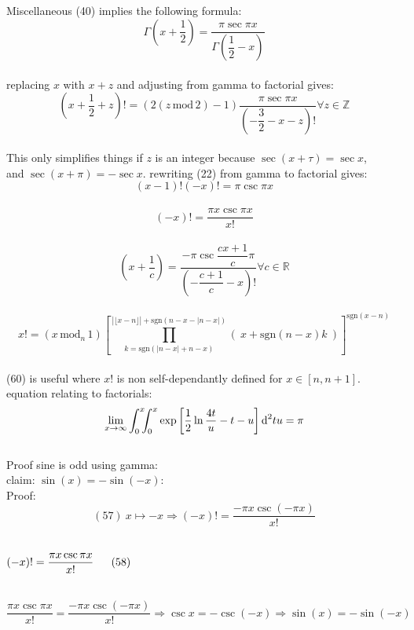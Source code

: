\documentclass[12pt]{article}
\begin{document}
\pagebreak\begin{section}{Miscellaneous}
	(40) implies the following formula:
	\begin{equation}
		\Gamma\left(x+\dfrac12\right)=\dfrac{\pi\sec\pi x}{\Gamma\left(\dfrac12-x\right)}
	\end{equation}\\
	replacing $x$ with $x+z$ and adjusting from gamma to factorial gives:\\
	\begin{equation}
		\left(x+\frac12+z\right)!=\left(2\left(z\,\text{mod}\,2\right)-1\right)\dfrac{\pi\sec\pi x}{\left(-\dfrac32-x-z\right)!}\forall z\in\mathbb Z
	\end{equation}\\
	This only simplifies things if $z$ is an integer because $\sec(x+\tau)=\sec x$,\\
	and $\sec(x+\pi)=-\sec x$. rewriting (22) from gamma to factorial gives:
	\begin{equation}
		(x-1)!(-x)!=\pi\csc\pi x
	\end{equation}\\
	\begin{equation}
		(-x)!=\dfrac{\pi x\csc\pi x}{x!}
	\end{equation}\\
	\begin{equation}
		\left(x+\dfrac1c\right)=\dfrac{-\pi\csc\dfrac{cx+1}c\pi}{\left(-\dfrac{c+1}c-x\right)!}\forall c\in\mathbb R
	\end{equation}\\
	\begin{equation}
		x!=(x\,\text{mod}_n\,1)\left[\prod_{k=\text{sgn}(|n-x|+n-x)}^{|\lfloor x-n\rfloor|+\text{sgn}(n-x-|n-x|)}\left(~x+\text{sgn}(n-x)k~\right)\right]^{\text{sgn}(x-n)}
	\end{equation}\\
	(60) is useful where $x!$ is non self-dependantly defined for $x\in[n,n+1]$.\\
	equation relating to factorials:
	\begin{equation}
		\lim_{x\to\infty}\int_0^x\hspace{-0.5em}\int_0^x\exp\left[\dfrac12\ln\dfrac{4t}u-t-u\right]\text d^2tu=\pi
	\end{equation}
	\pagebreak\\
	Proof sine is odd using gamma:\\
	claim: $\sin(x)=-\sin(-x)$:\\
	Proof:\\
	\begin{equation}
		(57)~x\mapsto-x\Longrightarrow(-x)!=\dfrac{-\pi x\csc(-\pi x)}{x!}
	\end{equation}\\
	\centerline{$(-x)!=\dfrac{\pi x\csc\pi x}{x!}\hspace{1.6em}(58)$}\\
	\begin{equation}
		\dfrac{\pi x\csc\pi x}{x!}=\dfrac{-\pi x\csc(-\pi x)}{x!}\Longrightarrow\csc x=-\csc(-x)\Longrightarrow\sin(x)=-\sin(-x)
	\end{equation}\\
	\blacksquare\\


\end{section}
\end{document}

